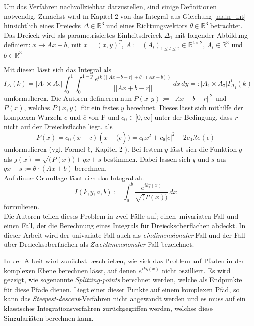 Um das Verfahren nachvollziehbar darzustellen, sind einige Definitionen notwendig.
Zunächst wird in Kapitel 2 von \cite{gasperini:hal-03209144} das Integral aus Gleichung \ref{main_int} hinsichtlich eines Dreiecks $\Delta \in \mathbb{R}^3$ und eines Richtungsvektors $\theta \in \mathbb{R}^3$ betrachtet.
Das Dreieck wird als parametrisiertes Einheitsdreieck $\Delta_1$ mit folgender Abbildung definiert: $x \rightarrow Ax + b$, mit $x = (x,y)^T$, $A:= (A_l)_{1\leq l \leq 2} \in \mathbb{R}^{3\times 2}$, $A_l \in \mathbb{R}^3$ und $b \in \mathbb{R}^3$ 

Mit diesen lässt sich das Integral als
\begin{equation}
    I_{\Delta}(k) = |A_1 \times A_2 | \int_{0}^{1} \int_{0}^{1-y}  \frac{e^{ik(||Ax + b - r|| +\theta \cdot (Ax +b))}}{||Ax + b - r ||}\,dx  \,dy  =: |A_1 \times A_2 | I_{\Delta_1}^1(k)
\end{equation}\label{main_def_int}
umformulieren. Die Autoren definieren nun $P(x,y) := ||Ax+b-r||^2$ und $P(x)$, welches $P(x,y)$ für ein festes $y$ berechnet.
Dieses lässt sich mithilfe der komplexen Wurzeln $c$ und $\overline{c}$ von P und $c_0 \in [0,\infty[$ unter der Bedingung, dass $r$ nicht auf der Dreiecksfläche liegt, als 
\begin{equation}
    P(x) = c_0(x-c)(x-\overline(c))= c_0x^2+c_0|c|^2-2c_0Re(c)
\end{equation}
umformulieren (vgl. Formel 6, Kapitel 2 \cite{gasperini:hal-03209144}).
Bei festem $y$ lässt sich die Funktion $g$ als $g(x) = \sqrt(P(x)) + qx + s$ bestimmen. Dabei lassen sich $q$ und $s$ aus $qx + s := \theta \cdot(Ax+b)$ berechnen.\\

Auf dieser Grundlage lässt sich das Integral als 
\begin{equation}
    I(k,y,a,b) := \int_{a}^{b}  \frac{e^{ikg(x)}}{\sqrt(P(x))}\,dx 
\end{equation}
formulieren.\\


Die Autoren teilen dieses Problem in zwei Fälle auf; einen univariaten Fall und einen Fall, der die Berechnung eines Integrals für Dreiecksoberflächen abdeckt.
In dieser Arbeit wird der univariate Fall auch als \textit{eindimensionaler} Fall und der Fall über Dreiecksoberflächen als \textit{Zweidimensionaler} Fall bezeichnet.

In der Arbeit \cite{gasperini:hal-03209144} wird zunächst beschrieben, wie sich das Problem auf Pfaden in der komplexen Ebene berechnen lässt, auf denen $e^{ikg(x)}$ nicht oszilliert.
Es wird gezeigt, wie sogenannte \textit{Splitting-points} berechnet werden, welche als Endpunkte für diese Pfade dienen.
Liegt einer dieser Punkte auf einem komplexen Pfad, so kann das \textit{Steepest-descent}-Verfahren nicht angewandt werden und es muss auf ein klassisches Integrationsverfahren zurückgegriffen werden, welches diese Singulariäten berechnen kann.


